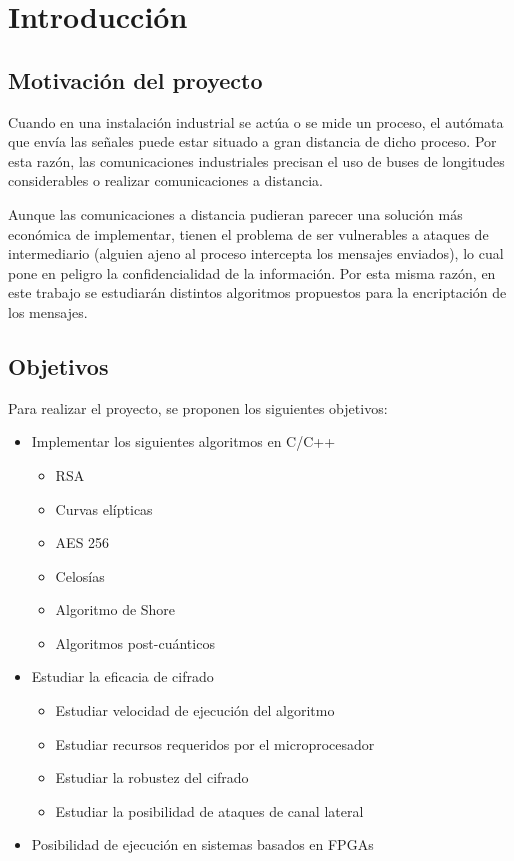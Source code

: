 \chapter{Introducción}

\section{Motivación del proyecto}
Cuando en una instalación industrial se actúa o se mide un proceso, el autómata que envía las señales puede estar situado a gran distancia de dicho proceso. Por esta razón, las comunicaciones industriales precisan el uso de buses de longitudes considerables o realizar comunicaciones a distancia. 
\newline

Aunque las comunicaciones a distancia pudieran parecer una solución más económica de implementar, tienen el problema de ser vulnerables a ataques de intermediario (alguien ajeno al proceso intercepta los mensajes enviados), lo cual pone en peligro la confidencialidad de la información. Por esta misma razón, en este trabajo se estudiarán distintos algoritmos propuestos para la encriptación de los mensajes.
\section{Objetivos}
Para realizar el proyecto, se proponen los siguientes objetivos:
\begin{itemize}
\item Implementar los siguientes algoritmos en C/C++
\begin{itemize}
	\item RSA
	\item Curvas elípticas
	\item AES 256
	\item Celosías
	\item Algoritmo de Shore
	\item Algoritmos post-cuánticos
\end{itemize}
\item Estudiar la eficacia de cifrado
\begin{itemize}
	\item Estudiar velocidad de ejecución del algoritmo
	\item Estudiar recursos requeridos por el microprocesador
	\item Estudiar la robustez del cifrado
	\item Estudiar la posibilidad de ataques de canal lateral
\end{itemize}
\item Posibilidad de ejecución en sistemas basados en FPGAs

\end{itemize}


